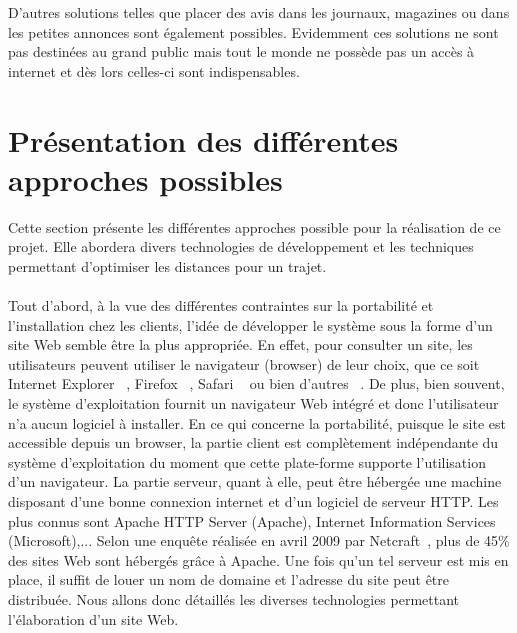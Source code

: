 \documentclass[12pt, a4paper, oneside]{article}
\begin{document}
    \indent D'autres solutions telles que placer des avis dans les journaux, magazines ou dans les petites annonces sont également possibles. Evidemment ces solutions ne sont pas destinées au grand public mais tout le monde ne possède pas un accès à internet et dès lors celles-ci sont indispensables.
\section{Présentation des différentes approches possibles}\label{approches}
    Cette section présente les différentes approches possible pour la réalisation de ce projet. Elle abordera divers technologies de développement et les techniques permettant d'optimiser les distances pour un trajet.\\\\
    \indent Tout d'abord, à la vue des différentes contraintes sur la portabilité et l'installation chez les clients, l'idée de développer le système sous la forme d'un site Web semble être la plus appropriée. En effet, pour consulter un site, les utilisateurs peuvent utiliser le navigateur (browser) de leur choix, que ce soit Internet Explorer ~\cite{internet-explorer}, Firefox ~\cite{firefox}, Safari ~\cite{safari} ou bien d'autres ~\cite{browser-list}. De plus, bien souvent, le système d'exploitation fournit un navigateur Web intégré et donc l'utilisateur n'a aucun logiciel à installer. En ce qui concerne la portabilité, puisque le site est accessible depuis un browser, la partie client est complètement indépendante du système d'exploitation du moment que cette plate-forme supporte l'utilisation d'un navigateur. La partie serveur, quant à elle, peut être hébergée une machine disposant d'une bonne connexion internet et d'un logiciel de serveur HTTP. Les plus connus sont Apache HTTP Server (Apache), Internet Information Services (Microsoft),... Selon une enquête réalisée en avril 2009 par Netcraft~\cite{server-survey}, plus de 45$\%$ des sites Web sont hébergés grâce à Apache. Une fois qu'un tel serveur est mis en place, il suffit de louer un nom de domaine et l'adresse du site peut être distribuée. Nous allons donc détaillés les diverses technologies permettant l'élaboration d'un site Web.\\\\
\end{document}
